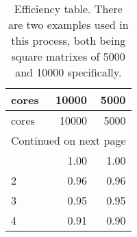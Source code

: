 \begin{longtable}{lrr}
	\caption[Efficiency]{Efficiency table. There are two examples used in this process, both being square matrixes of 5000 and 10000 specifically.}
	\label{tab:efficiency}
	\\
\toprule
cores & 10000 & 5000 \\
\midrule
\endfirsthead
\toprule
cores & 10000 & 5000 \\
\midrule
\endhead
\midrule
\multicolumn{3}{r}{Continued on next page} \\
\midrule
\endfoot
\bottomrule
\endlastfoot
1 & 1.00 & 1.00 \\
2 & 0.96 & 0.96 \\
3 & 0.95 & 0.95 \\
4 & 0.91 & 0.90 \\
\end{longtable}

